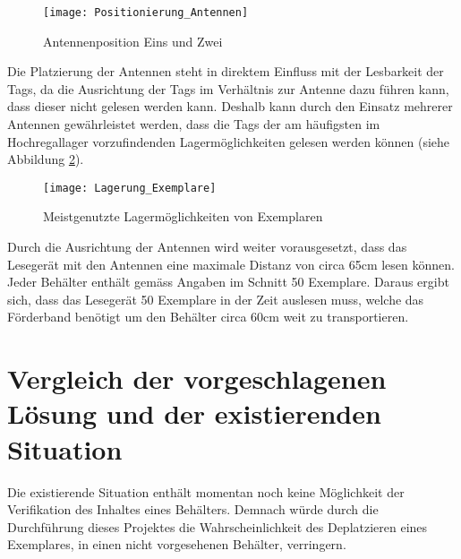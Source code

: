 \begin{figure}[htb]
	\centering
	\texttt{[image: Positionierung\_Antennen]}
	\caption{Antennenposition Eins und Zwei}
	\label{fig:positionAntennen}
\end{figure}

Die Platzierung der Antennen steht in direktem Einfluss mit der Lesbarkeit der Tags, da die Ausrichtung der Tags im Verhältnis zur Antenne dazu führen kann, dass dieser nicht gelesen werden kann. Deshalb kann durch den Einsatz mehrerer Antennen gewährleistet werden, dass die Tags der am häufigsten im Hochregallager vorzufindenden Lagermöglichkeiten gelesen werden können (siehe Abbildung \ref{fig:lagermöglichkeitExemplare}).

\begin{figure}[htb]
	\centering
	\texttt{[image: Lagerung\_Exemplare]}
	\caption{Meistgenutzte Lagermöglichkeiten von Exemplaren}
	\label{fig:lagermöglichkeitExemplare}
\end{figure}

Durch die Ausrichtung der Antennen wird weiter vorausgesetzt, dass das Lesegerät mit den Antennen eine maximale Distanz von circa 65cm lesen können. Jeder Behälter enthält gemäss Angaben im Schnitt 50 Exemplare. Daraus ergibt sich, dass das Lesegerät 50 Exemplare in der Zeit auslesen muss, welche das Förderband benötigt um den Behälter circa 60cm weit zu transportieren.

\section{Vergleich der vorgeschlagenen Lösung und der existierenden Situation}
Die existierende Situation enthält momentan noch keine Möglichkeit der Verifikation des Inhaltes eines Behälters. Demnach würde durch die Durchführung dieses Projektes die Wahrscheinlichkeit des Deplatzieren eines Exemplares, in einen nicht vorgesehenen Behälter, verringern.

